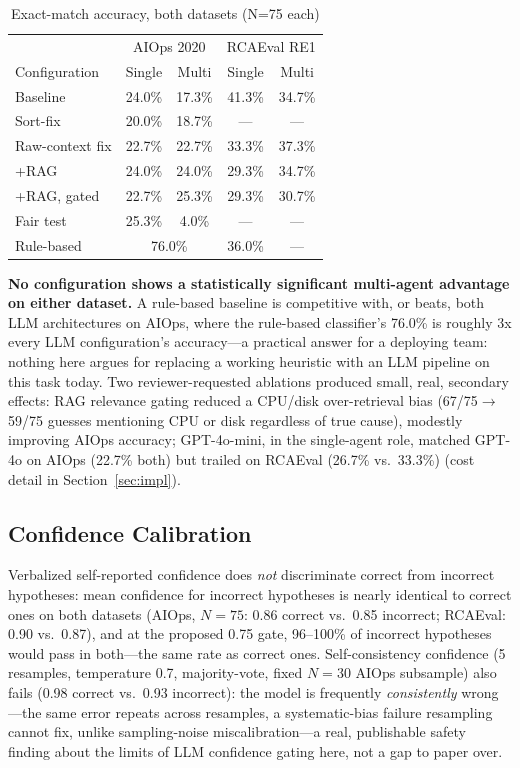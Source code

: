 \documentclass[10pt,conference]{IEEEtran}
\begin{document}
\begin{table}[h]
\caption{Exact-match accuracy, both datasets (N=75 each)}
\label{tab:results}
\centering
\footnotesize
\begin{tabular}{lcccc}
\toprule
& \multicolumn{2}{c}{AIOps 2020} & \multicolumn{2}{c}{RCAEval RE1} \\
Configuration & Single & Multi & Single & Multi \\
\midrule
Baseline & 24.0\% & 17.3\% & 41.3\% & 34.7\% \\
Sort-fix & 20.0\% & 18.7\% & --- & --- \\
Raw-context fix & 22.7\% & 22.7\% & 33.3\% & 37.3\% \\
+RAG & 24.0\% & 24.0\% & 29.3\% & 34.7\% \\
+RAG, gated & 22.7\% & 25.3\% & 29.3\% & 30.7\% \\
Fair test\footnotemark[1] & 25.3\% & 4.0\% & --- & --- \\
Rule-based\footnotemark[2] & \multicolumn{2}{c}{76.0\%} & 36.0\% & --- \\
\bottomrule
\end{tabular}
\end{table}

\textbf{No configuration shows a statistically significant multi-agent
advantage on either dataset.} A rule-based baseline is competitive with, or
beats, both LLM architectures on AIOps, where the rule-based classifier's
76.0\% is roughly 3x every LLM configuration's accuracy---a practical
answer for a deploying team: nothing here argues for replacing a working
heuristic with an LLM pipeline on this task today. Two reviewer-requested ablations produced small, real,
secondary effects: RAG relevance gating reduced a CPU/disk over-retrieval
bias (67/75$\to$59/75 guesses mentioning CPU or disk regardless of true
cause), modestly improving AIOps accuracy; GPT-4o-mini, in the
single-agent role, matched GPT-4o on AIOps (22.7\% both) but trailed on
RCAEval (26.7\% vs.\ 33.3\%) (cost detail in Section~\ref{sec:impl}).

\subsection{Confidence Calibration}
\label{sec:confidence}
Verbalized self-reported confidence does \emph{not} discriminate correct
from incorrect hypotheses: mean confidence for incorrect hypotheses is
nearly identical to correct ones on both datasets (AIOps, $N{=}75$: 0.86
correct vs.\ 0.85 incorrect; RCAEval: 0.90 vs.\ 0.87), and at the proposed
0.75 gate, 96--100\% of incorrect hypotheses would pass in both---the same
rate as correct ones. Self-consistency confidence (5 resamples, temperature
0.7, majority-vote, fixed $N{=}30$ AIOps subsample) also fails (0.98
correct vs.\ 0.93 incorrect): the model is frequently \emph{consistently}
wrong---the same error repeats across resamples, a systematic-bias failure
resampling cannot fix, unlike sampling-noise miscalibration---a real,
publishable safety finding about the limits of LLM confidence gating here,
not a gap to paper over.
\end{document}
